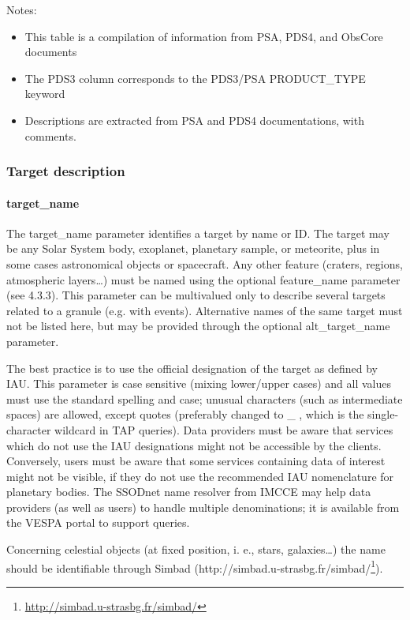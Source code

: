\documentclass[11pt,a4paper]{ivoa}
\begin{document}
Notes:

\begin{itemize}
\item This table is a compilation of information from PSA, PDS4, and ObsCore documents
\item The PDS3 column corresponds to the PDS3/PSA PRODUCT\_TYPE keyword
\item Descriptions are extracted from PSA and PDS4 documentations, with comments.
\end{itemize}

\subsubsection{Target description}

\paragraph{target\_name}

The target\_name parameter identifies a target by name or ID. The target may be any Solar System body, exoplanet, planetary sample, or meteorite, plus in some cases astronomical objects or spacecraft. Any other feature (craters, regions, atmospheric layers…) must be named using the optional feature\_name parameter (see 4.3.3). This parameter can be multivalued only to describe several targets related to a granule (e.g. with events). Alternative names of the same target must not be listed here, but may be provided through the optional alt\_target\_name parameter. 

The best practice is to use the official designation of the target as defined by IAU. This parameter is case sensitive (mixing lower/upper cases) and all values must use the standard spelling and case; unusual characters (such as intermediate spaces) are allowed, except quotes (preferably changed to \_ , which is the single-character wildcard in TAP queries). Data providers must be aware that services which do not use the IAU designations might not be accessible by the clients. Conversely, users must be aware that some services containing data of interest might not be visible, if they do not use the recommended IAU nomenclature for planetary bodies. The SSODnet name resolver from IMCCE may help data providers (as well as users) to handle multiple denominations; it is available from the VESPA portal to support queries.

Concerning celestial objects (at fixed position, i. e., stars, galaxies…) the name should be identifiable through Simbad (http://simbad.u-strasbg.fr/simbad/\footnote{\url{http://simbad.u-strasbg.fr/simbad/}}).
\end{document}
